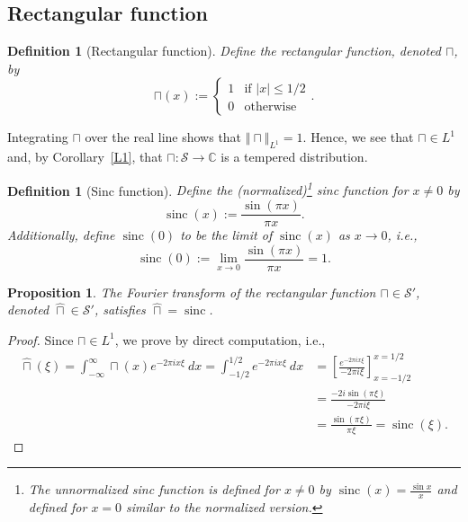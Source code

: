 \documentclass[12pt, letterpaper]{article}
\theoremstyle{plain}
\newtheorem{definition}[theorem]{Definition}
\newtheorem{proposition}[theorem]{Proposition}
\DeclareMathOperator{\sinc}{sinc}
\begin{document}
\subsection{Rectangular function}\label{sec31}

\begin{definition}[Rectangular function]
    Define the rectangular function, denoted $\sqcap$, by
    \begin{equation}
        \sqcap(x) := 
        \begin{cases}
            1 & \text{if } \vert x \vert \le 1/2 \\
            0 & \text{otherwise}
        \end{cases}.
    \end{equation}
\end{definition}

Integrating $\sqcap$ over the real line shows that $\Vert \sqcap \Vert_{L^1} = 1$. Hence, we see that $\sqcap \in L^1$ and, by Corollary~\ref{L1}, that $\sqcap: \mathcal{S} \to \mathbb{C}$ is a tempered distribution.

\begin{definition}[Sinc function]
    Define the (normalized)\footnote{The unnormalized sinc function is defined for $x \neq 0$ by $\sinc(x) = \frac{\sin x}{x}$ and defined for $x = 0$ similar to the normalized version.} sinc function for $x \neq 0$ by
    \begin{equation}
        \sinc(x) := \frac{\sin(\pi x)}{\pi x}.
    \end{equation}
    Additionally, define $\sinc(0)$ to be the limit of $\sinc(x)$ as $x \to 0$, i.e.,
    \begin{equation}
        \sinc(0) := \lim_{x \to 0} \frac{\sin (\pi x)}{\pi x} = 1.
    \end{equation}
\end{definition}

\begin{proposition}
    The Fourier transform of the rectangular function $\sqcap \in \mathcal{S}'$, denoted $\hat{\sqcap} \in \mathcal{S}'$, satisfies $\hat{\sqcap} = \sinc$.
\end{proposition}

\begin{proof}
    Since $\sqcap \in L^1$, we prove by direct computation, i.e.,
    \begin{align}
        \hat{\sqcap}(\xi) = \int_{-\infty}^\infty \sqcap(x) e^{-2\pi ix\xi} \ dx = \int_{-1/2}^{1/2} e^{-2\pi ix\xi} \ dx & = \left[ \frac{e^{-2\pi ix\xi}}{-2\pi i\xi} \right]_{x = -1/2}^{x = 1/2} 
        \\ & = \frac{-2i\sin(\pi \xi)}{-2\pi i \xi} 
        \\ & = \frac{\sin (\pi \xi)}{\pi \xi} = \sinc(\xi).
    \end{align}
\end{proof}
\end{document}

